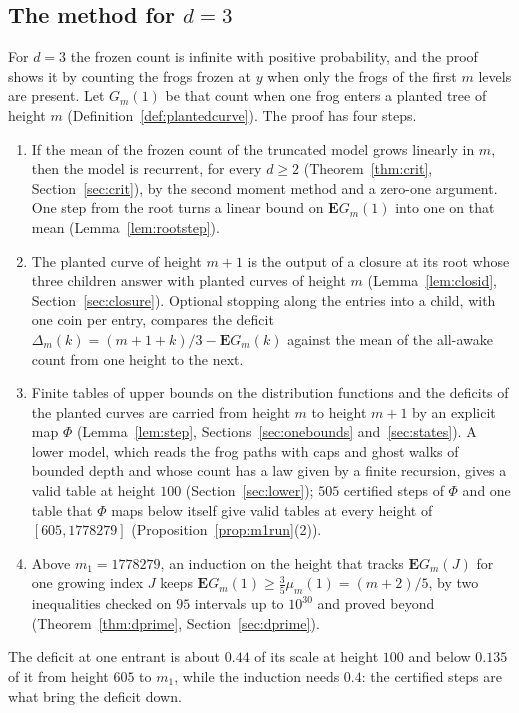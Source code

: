 \documentclass[11pt]{amsart}
\theoremstyle{definition}
\numberwithin{equation}{section}
\newcommand{\E}{\mathbf{E}}
\begin{document}
\subsection*{The method for $d=3$}
For $d=3$ the frozen count is infinite with positive probability, and the proof shows it by counting the frogs frozen at $y$ when only the frogs of the first $m$ levels are present. Let $G_m(1)$ be that count when one frog enters a planted tree of height $m$ (Definition~\ref{def:plantedcurve}). The proof has four steps.
\begin{enumerate}
\item If the mean of the frozen count of the truncated model grows linearly in $m$, then the model is recurrent, for every $d\ge2$ (Theorem~\ref{thm:crit}, Section~\ref{sec:crit}), by the second moment method and a zero-one argument. One step from the root turns a linear bound on $\E G_m(1)$ into one on that mean (Lemma~\ref{lem:rootstep}).
\item The planted curve of height $m+1$ is the output of a closure at its root whose three children answer with planted curves of height $m$ (Lemma~\ref{lem:closid}, Section~\ref{sec:closure}). Optional stopping along the entries into a child, with one coin per entry, compares the deficit $\Delta_m(k)=(m+1+k)/3-\E G_m(k)$ against the mean of the all-awake count from one height to the next.
\item Finite tables of upper bounds on the distribution functions and the deficits of the planted curves are carried from height $m$ to height $m+1$ by an explicit map $\Phi$ (Lemma~\ref{lem:step}, Sections~\ref{sec:onebounds} and~\ref{sec:states}). A lower model, which reads the frog paths with caps and ghost walks of bounded depth and whose count has a law given by a finite recursion, gives a valid table at height $100$ (Section~\ref{sec:lower}); $505$ certified steps of $\Phi$ and one table that $\Phi$ maps below itself give valid tables at every height of $[605,1778279]$ (Proposition~\ref{prop:m1run}(2)).
\item Above $m_1=1778279$, an induction on the height that tracks $\E G_m(J)$ for one growing index $J$ keeps $\E G_m(1)\ge\frac35\mu_m(1)=(m+2)/5$, by two inequalities checked on $95$ intervals up to $10^{30}$ and proved beyond (Theorem~\ref{thm:dprime}, Section~\ref{sec:dprime}).
\end{enumerate}
The deficit at one entrant is about $0.44$ of its scale at height $100$ and below $0.135$ of it from height $605$ to $m_1$, while the induction needs $0.4$: the certified steps are what bring the deficit down.
\end{document}
